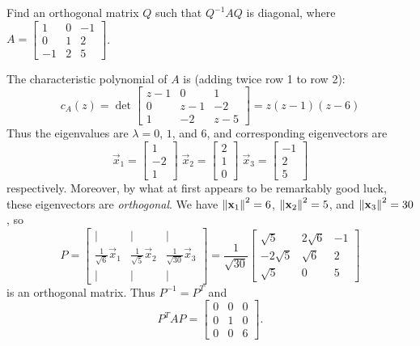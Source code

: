 \documentclass{ximera}
\begin{document}
\begin{example}\label{ex:DiagonalizeSymmetricMatrix}
Find an orthogonal matrix $Q$ such that $Q^{-1}AQ$ is diagonal, where $A = \begin{bmatrix}
1 & 0 & -1 \\
0 & 1 & 2 \\
-1 & 2 & 5
\end{bmatrix}$.

\begin{explanation}
 The characteristic polynomial of $A$ is (adding twice row 1 to row 2):
\begin{equation*}
c_{A}(z) = \det \begin{bmatrix}
z - 1 & 0 & 1 \\
0 & z - 1 & -2 \\
1 & -2 & z - 5
\end{bmatrix} = z(z - 1)(z - 6)
\end{equation*}
Thus the eigenvalues are $\lambda = 0$, $1$, and $6$, and corresponding eigenvectors are
\begin{equation*}
\vec{x}_{1} = \begin{bmatrix}
1 \\
-2 \\
1
\end{bmatrix} \;
\vec{x}_{2} = \begin{bmatrix}
2 \\
1 \\
0
\end{bmatrix} \;
\vec{x}_{3} = \begin{bmatrix}
-1 \\
2 \\
5
\end{bmatrix}
\end{equation*}
respectively. Moreover, by what at first appears to be remarkably good luck, these eigenvectors are \textit{orthogonal}. We have $\left\lVert\mathbf{x}_{1}\right\rVert^{2} = 6$, $\left\lVert\mathbf{x}_{2}\right\rVert^{2} = 5$, and $\left\lVert\mathbf{x}_{3}\right\rVert^{2} = 30$, so
\begin{equation*}
P = \begin{bmatrix}
| & | &  | \\
\frac{1}{\sqrt{6}}\vec{x}_{1} & \frac{1}{\sqrt{5}}\vec{x}_{2} & \frac{1}{\sqrt{30}}\vec{x}_{3} \\
| & | &  | 
\end{bmatrix} = \frac{1}{\sqrt{30}} \begin{bmatrix}
\sqrt{5} & 2\sqrt{6} & -1 \\
-2\sqrt{5} & \sqrt{6} & 2 \\
\sqrt{5} & 0 & 5
\end{bmatrix}
\end{equation*}
is an orthogonal matrix. Thus $P^{-1} = P^{T}$ and
\begin{equation*}
P^TAP = \begin{bmatrix}
0 & 0 & 0 \\
0 & 1 & 0 \\
0 & 0 & 6
\end{bmatrix}.
\end{equation*}

\end{explanation}
\end{example}
\end{document}
